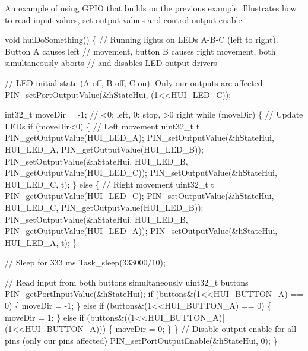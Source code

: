 An example of using G\+P\+I\+O that builds on the previous example. Illustrates how to read input values, set output values and control output enable 
\begin{DoxyCode}
\textcolor{keywordtype}{void} huiDoSomething() \{
    \textcolor{comment}{// Running lights on LEDs A-B-C (left to right). Button A causes left}
    \textcolor{comment}{// movement, button B causes right movement, both simultaneously aborts}
    \textcolor{comment}{// and disables LED output drivers}

    \textcolor{comment}{// LED initial state (A off, B off, C on). Only our outputs are affected}
    PIN_setPortOutputValue(&hStateHui, (1<<HUI\_LED\_C));

    int32\_t moveDir = -1;    \textcolor{comment}{// <0: left, 0: stop, >0 right}
    \textcolor{keywordflow}{while} (moveDir) \{
        \textcolor{comment}{// Update LEDs}
        \textcolor{keywordflow}{if} (moveDir<0) \{
            \textcolor{comment}{// Left movement}
            uint32\_t t = PIN_getOutputValue(HUI\_LED\_A);
            PIN_setOutputValue(&hStateHui, HUI\_LED\_A, PIN_getOutputValue(HUI\_LED\_B));
            PIN_setOutputValue(&hStateHui, HUI\_LED\_B, PIN_getOutputValue(HUI\_LED\_C));
            PIN_setOutputValue(&hStateHui, HUI\_LED\_C, t);
        \} \textcolor{keywordflow}{else} \{
            \textcolor{comment}{// Right movement}
            uint32\_t t = PIN_getOutputValue(HUI\_LED\_C);
            PIN_setOutputValue(&hStateHui, HUI\_LED\_C, PIN_getOutputValue(HUI\_LED\_B));
            PIN_setOutputValue(&hStateHui, HUI\_LED\_B, PIN_getOutputValue(HUI\_LED\_A));
            PIN_setOutputValue(&hStateHui, HUI\_LED\_A, t);
        \}

        \textcolor{comment}{// Sleep for 333 ms}
        Task\_sleep(333000/10);

        \textcolor{comment}{// Read input from both buttons simultaneously}
        uint32\_t buttons = PIN_getPortInputValue(&hStateHui);
        \textcolor{keywordflow}{if} (buttons&(1<<HUI\_BUTTON\_A) == 0) \{
            moveDir = -1;
        \} \textcolor{keywordflow}{else} \textcolor{keywordflow}{if} (buttons&(1<<HUI\_BUTTON\_A) == 0) \{
             moveDir = 1;
        \} \textcolor{keywordflow}{else} \textcolor{keywordflow}{if} (buttons&((1<<HUI\_BUTTON\_A)|(1<<HUI\_BUTTON\_A))) \{
            moveDir = 0;
        \}
    \}
    \textcolor{comment}{// Disable output enable for all pins (only our pins affected)}
    PIN_setPortOutputEnable(&hStateHui, 0);
\}
\end{DoxyCode}


